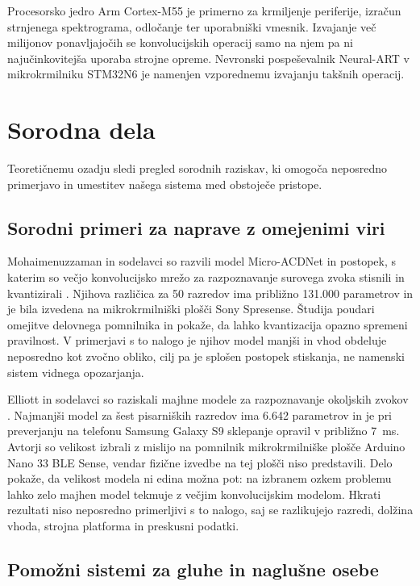 Procesorsko jedro Arm Cortex-M55 je primerno za krmiljenje
periferije, izračun strnjenega spektrograma, odločanje ter uporabniški vmesnik. Izvajanje
več milijonov ponavljajočih se konvolucijskih operacij samo na njem pa ni
najučinkovitejša uporaba strojne opreme. Nevronski pospeševalnik Neural-ART v
mikrokrmilniku STM32N6 je namenjen vzporednemu izvajanju takšnih operacij.

\clearpage
\section{Sorodna dela}

Teoretičnemu ozadju sledi pregled sorodnih raziskav, ki omogoča neposredno primerjavo 
in umestitev našega sistema med obstoječe pristope.

\subsection{Sorodni primeri za naprave z omejenimi viri}

Mohaimenuzzaman in sodelavci so razvili model Micro-ACDNet in postopek, s
katerim so večjo konvolucijsko mrežo za razpoznavanje surovega zvoka stisnili
in kvantizirali \cite{mohaimenuzzaman2023edge}. Njihova različica za 50 razredov ima približno
131.000 parametrov in je bila izvedena na mikrokrmilniški plošči Sony Spresense.
Študija poudari omejitve delovnega pomnilnika in pokaže, da lahko kvantizacija
opazno spremeni pravilnost. V primerjavi s to nalogo je njihov model manjši in vhod
obdeluje neposredno kot zvočno obliko, cilj pa je splošen postopek stiskanja,
ne namenski sistem vidnega opozarjanja.

Elliott in sodelavci so raziskali majhne modele za
razpoznavanje okoljskih zvokov \cite{elliott2021tiny}. Najmanjši model za šest
pisarniških razredov ima 6.642 parametrov in je pri preverjanju na telefonu
Samsung Galaxy S9 sklepanje opravil v približno \SI{7}{\milli\second}. Avtorji
so velikost izbrali z mislijo na pomnilnik mikrokrmilniške plošče Arduino Nano
33 BLE Sense, vendar fizične izvedbe na tej plošči niso predstavili. Delo
pokaže, da velikost modela ni edina možna pot: na izbranem ozkem problemu lahko
zelo majhen model tekmuje z večjim konvolucijskim modelom. Hkrati rezultati niso
neposredno primerljivi s to nalogo, saj se razlikujejo razredi, dolžina vhoda,
strojna platforma in preskusni podatki.

\subsection{Pomožni sistemi za gluhe in naglušne osebe}

